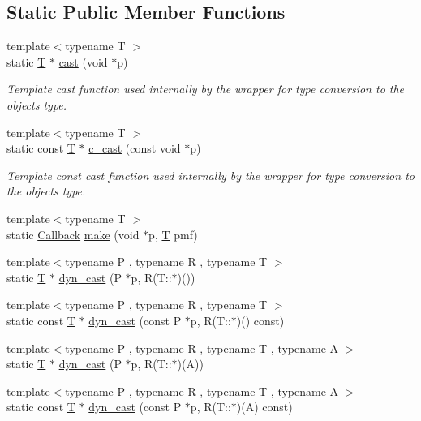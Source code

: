 \subsection*{Static Public Member Functions}
\begin{DoxyCompactItemize}
\item 
{\footnotesize template$<$typename T $>$ }\\static \hyperlink{class_t}{T} $\ast$ \hyperlink{class_d_d4hep_1_1_callback_a36c5bf29bb29ea51f37f27ae292d40c6}{cast} (void $\ast$p)
\begin{DoxyCompactList}\small\item\em Template cast function used internally by the wrapper for type conversion to the object\textquotesingle{}s type. \end{DoxyCompactList}\item 
{\footnotesize template$<$typename T $>$ }\\static const \hyperlink{class_t}{T} $\ast$ \hyperlink{class_d_d4hep_1_1_callback_af36d4cfe3679ddb677a6cc92bae5c159}{c\+\_\+cast} (const void $\ast$p)
\begin{DoxyCompactList}\small\item\em Template const cast function used internally by the wrapper for type conversion to the object\textquotesingle{}s type. \end{DoxyCompactList}\item 
{\footnotesize template$<$typename T $>$ }\\static \hyperlink{class_d_d4hep_1_1_callback}{Callback} \hyperlink{class_d_d4hep_1_1_callback_a47c442bf1cc3b69aaa17f4290422e88f}{make} (void $\ast$p, \hyperlink{class_t}{T} pmf)
\item 
{\footnotesize template$<$typename P , typename R , typename T $>$ }\\static \hyperlink{class_t}{T} $\ast$ \hyperlink{class_d_d4hep_1_1_callback_a43c24c6deb1eb616f4e21d6653ac2162}{dyn\+\_\+cast} (P $\ast$p, R(T\+::$\ast$)())
\item 
{\footnotesize template$<$typename P , typename R , typename T $>$ }\\static const \hyperlink{class_t}{T} $\ast$ \hyperlink{class_d_d4hep_1_1_callback_ada8b9e61abfed4f65dafeb87de834421}{dyn\+\_\+cast} (const P $\ast$p, R(T\+::$\ast$)() const)
\item 
{\footnotesize template$<$typename P , typename R , typename T , typename A $>$ }\\static \hyperlink{class_t}{T} $\ast$ \hyperlink{class_d_d4hep_1_1_callback_a0c20bd2390e3d4cd2c24a2228d71f6e9}{dyn\+\_\+cast} (P $\ast$p, R(T\+::$\ast$)(A))
\item 
{\footnotesize template$<$typename P , typename R , typename T , typename A $>$ }\\static const \hyperlink{class_t}{T} $\ast$ \hyperlink{class_d_d4hep_1_1_callback_a3e2e1256e6dadd456674144094b0de85}{dyn\+\_\+cast} (const P $\ast$p, R(T\+::$\ast$)(A) const)
\end{DoxyCompactItemize}
